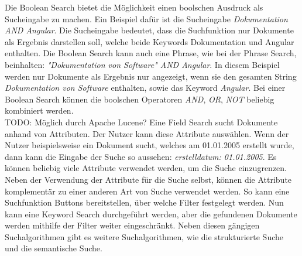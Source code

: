 Die Boolean Search bietet die Möglichkeit einen boolschen Ausdruck als Sucheingabe zu machen.
Ein Beispiel dafür ist die Sucheingabe \textit{Dokumentation AND Angular}.
Die Sucheingabe bedeutet, dass die Suchfunktion nur Dokumente als Ergebnis darstellen soll, welche beide Keywords Dokumentation und Angular enthalten.
Die Boolean Search kann auch eine Phrase, wie bei der Phrase Search, beinhalten: \textit{"Dokumentation von Software" AND Angular}.
In diesem Beispiel werden nur Dokumente als Ergebnis nur angezeigt, wenn sie den gesamten String \textit{Dokumentation von Software} enthalten, sowie das Keyword \textit{Angular}.
Bei einer Boolean Search können die boolschen Operatoren \textit{AND}, \textit{OR}, \textit{NOT} beliebig kombiniert werden.\\

TODO: Möglich durch Apache Lucene?
Eine Field Search sucht Dokumente anhand von Attributen.
Der Nutzer kann diese Attribute auswählen.
Wenn der Nutzer beispielsweise ein Dokument sucht, welches am 01.01.2005 erstellt wurde, dann kann die Eingabe der Suche so aussehen: \textit{erstelldatum: 01.01.2005}.
Es können beliebig viele Attribute verwendet werden, um die Suche einzugrenzen.
Neben der Verwendung der Attribute für die Suche selbst, können die Attribute komplementär zu einer anderen Art von Suche verwendet werden.
So kann eine Suchfunktion Buttons bereitstellen, über welche Filter festgelegt werden.
Nun kann eine Keyword Search durchgeführt werden, aber die gefundenen Dokumente werden mithilfe der Filter weiter eingeschränkt.
Neben diesen gängigen Suchalgorithmen gibt es weitere Suchalgorithmen, wie die strukturierte Suche und die semantische Suche.